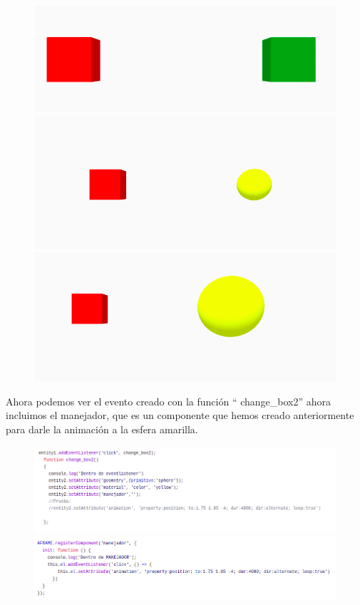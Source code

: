 \documentclass[a4paper, 12pt]{book}
\begin{document}
\begin{figure}[h]
\centering
    \includegraphics[scale=0.5]{img/escena1_2a.png}
    \includegraphics[scale=0.3]{img/escena1_3a.png}
    \includegraphics[scale=0.3]{img/escena1_3b.png}
\end{figure}

Ahora podemos ver el evento creado con la función “ change\_box2” ahora incluimos el manejador, que es un componente que hemos creado anteriormente para darle la animación a la esfera amarilla.

\begin{figure}[h]
\centering
 \includegraphics[scale=0.55]{img/code_1-3a.png}
  \includegraphics[scale=0.55]{img/code_1-3b.png}
\end{figure}
\end{document}
